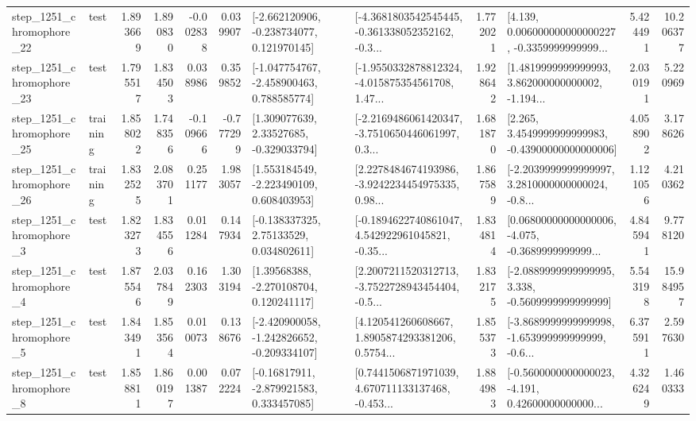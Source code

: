\begin{tabular}{llrrrrllrlrr}
 step\_1251\_chromophore\_22 &      test &      1.893669 &    1.890830 &     -0.002838 &  0.039907 &   [-2.662120906, -0.238734077, 0.121970145] &  [-4.3681803542545445, -0.361338052352162, -0.3... &       1.772021 &  [4.139, 0.006000000000000227, -0.3359999999999... &            5.424491 &         10.206377 \\
 step\_1251\_chromophore\_23 &      test &      1.795517 &    1.834503 &      0.038986 &  0.359852 &   [-1.047754767, -2.458900463, 0.788585774] &  [-1.9550332878812324, -4.015875354561708, 1.47... &       1.928642 &  [1.4819999999999993, 3.862000000000002, -1.194... &            2.030191 &          5.220969 \\
 step\_1251\_chromophore\_25 &  training &      1.858022 &    1.748356 &     -0.109666 & -0.777299 &     [1.309077639, 2.33527685, -0.329033794] &  [-2.2169486061420347, -3.7510650446061997, 0.3... &       1.681870 &  [2.265, 3.4549999999999983, -0.43900000000000006] &            4.058902 &          3.178626 \\
 step\_1251\_chromophore\_26 &  training &      1.832525 &    2.083701 &      0.251177 &  1.983057 &    [1.553184549, -2.223490109, 0.608403953] &  [2.2278484674193986, -3.9242234454975335, 0.98... &       1.867589 &  [-2.2039999999999997, 3.2810000000000024, -0.8... &            1.121056 &          4.210362 \\
  step\_1251\_chromophore\_3 &      test &      1.823273 &    1.834556 &      0.011284 &  0.147934 &     [-0.138337325, 2.75133529, 0.034802611] &  [-0.1894622740861047, 4.542922961045821, -0.35... &       1.834814 &  [0.06800000000000006, -4.075, -0.3689999999999... &            4.845941 &          9.778120 \\
  step\_1251\_chromophore\_4 &      test &      1.875546 &    2.037849 &      0.162303 &  1.303194 &     [1.39568388, -2.270108704, 0.120241117] &  [2.2007211520312713, -3.7522728943454404, -0.5... &       1.832175 &  [-2.0889999999999995, 3.338, -0.5609999999999999] &            5.543198 &         15.984957 \\
  step\_1251\_chromophore\_5 &      test &      1.843491 &    1.853564 &      0.010073 &  0.138676 &  [-2.420900058, -1.242826652, -0.209334107] &  [4.120541260608667, 1.8905874293381206, 0.5754... &       1.855373 &  [-3.8689999999999998, -1.653999999999999, -0.6... &            6.375911 &          2.597630 \\
  step\_1251\_chromophore\_8 &      test &      1.858811 &    1.860197 &      0.001387 &  0.072224 &    [-0.16817911, -2.879921583, 0.333457085] &  [0.7441506871971039, 4.670711133137468, -0.453... &       1.884983 &  [-0.5600000000000023, -4.191, 0.42600000000000... &            4.326249 &          1.460333 \\

\end{tabular}
